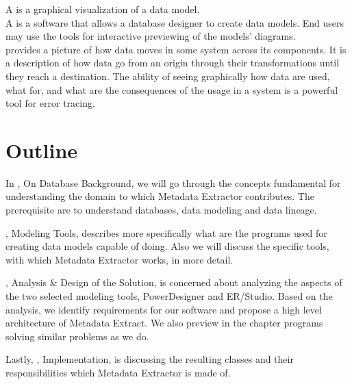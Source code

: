 A  is a graphical visualization of a data model. \\

A  is a software that allows a database designer to create data models. End users may use the tools for interactive previewing of the models' diagrams. \\

 provides a picture of how data moves in some system across its components. It is a description of how data go from an origin through their transformations until they reach a destination. 
The ability of seeing graphically how data are used, what for, and what are the consequences of the usage in a system is a powerful tool for error tracing. \\

\section{Outline}

In , On Database Background, we will go through the concepts fundamental for understanding the domain to which Metadata Extractor contributes. The prerequisite are to understand databases, data modeling and data lineage.

, Modeling Tools, describes more specifically what are the programs used for creating data models capable of doing.
Also we will discuss the specific tools, with which Metadata Extractor works, in more detail.

, Analysis \& Design of the Solution, is concerned about analyzing the aspects of the two selected modeling tools, PowerDesigner and ER/Studio. 
Based on the analysis, we identify requirements for our software and propose a high level architecture of Metadata Extract. 
We also preview in the chapter programs solving similar problems as we do.

Lastly, , Implementation, is discussing the resulting classes and their responsibilities which Metadata Extractor is made of.


